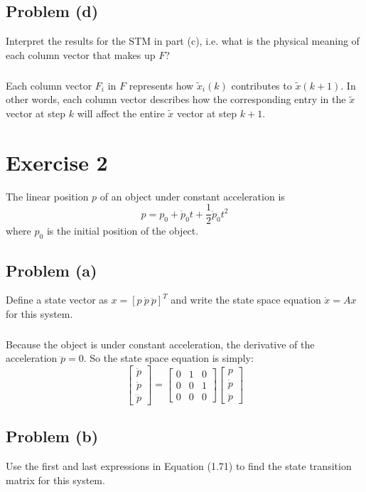 \documentclass[11pt]{article}
\begin{document}
\subsection*{Problem (d)}
Interpret the results for the STM in part (c), i.e. what is the physical meaning of each column vector that makes up $F$?

\subparagraph{}
Each column vector $F_i$ in $F$ represents how $\tilde{x}_i(k)$ contributes to $\tilde{x}(k+1)$. In other words, each column vector describes how the corresponding entry in the $\tilde{x}$ vector at step $k$ will affect the entire $\tilde{x}$ vector at step $k+1$.

\section*{Exercise 2}
The linear position $p$ of an object under constant acceleration is
\begin{equation*}
	p = p_0 + \dot{p}_0t + \frac{1}{2}\ddot{p}_0t^2
\end{equation*}
where $p_0$ is the initial position of the object.

\subsection*{Problem (a)}
Define a state vector as $x=[p\ \dot{p}\ \ddot{p}]^T$ and write the state space equation $\dot{x} = Ax$ for this system.

\subparagraph*{}
Because the object is under constant acceleration, the derivative of the acceleration $\dddot{p} = 0$. So the state space equation is simply:
\begin{equation*}
	\begin{bmatrix} \dot{p} \\ \ddot{p} \\ \dddot{p} \end{bmatrix} = \begin{bmatrix} 0 & 1 & 0 \\ 0 & 0 & 1 \\ 0 & 0 & 0 \end{bmatrix} \begin{bmatrix} p \\ \dot{p} \\ \ddot{p} \end{bmatrix}
\end{equation*}

\subsection*{Problem (b)}
Use the first and last expressions in Equation (1.71) to find the state transition matrix for this system.
\end{document}
